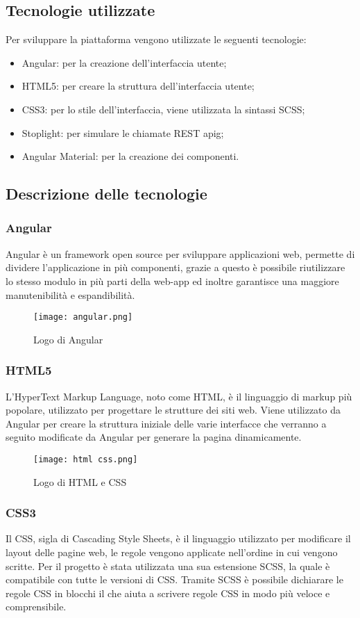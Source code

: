 \subsection{Tecnologie utilizzate}
Per sviluppare la piattaforma vengono utilizzate le seguenti tecnologie:
\begin{itemize}
    \item Angular: per la creazione dell'interfaccia utente;
    \item HTML5: per creare la struttura dell'interfaccia utente;
    \item CSS3: per lo stile dell'interfaccia, viene utilizzata la sintassi SCSS;
    \item Stoplight: per simulare le chiamate REST \gls{apig};
    \item Angular Material: per la creazione dei componenti.
\end{itemize}
\subsection{Descrizione delle tecnologie}
\subsubsection{Angular}
Angular è un framework open source per sviluppare applicazioni web, permette di dividere l'applicazione in più componenti, grazie a questo è possibile riutilizzare lo stesso modulo in più parti della web-app ed inoltre garantisce una maggiore manutenibilità e espandibilità.
\begin{figure}[H]
    \centering
    \texttt{[image: angular.png]}
    \caption{Logo di Angular}
\end{figure}
\subsubsection{HTML5}
L'HyperText Markup Language, noto come HTML, è il linguaggio di markup più popolare, utilizzato per progettare le strutture dei siti web. Viene utilizzato da Angular per creare la struttura iniziale delle varie interfacce che verranno a seguito modificate da Angular per generare la pagina dinamicamente.
\begin{figure}[H]
    \centering
    \texttt{[image: html css.png]}
    \caption{Logo di HTML e CSS}
\end{figure}
\subsubsection{CSS3}
Il CSS, sigla di Cascading Style Sheets, è il linguaggio utilizzato per modificare il layout delle pagine web, le regole vengono applicate nell'ordine in cui vengono scritte. Per il progetto è stata utilizzata una sua estensione SCSS, la quale è compatibile con tutte le versioni di CSS. Tramite SCSS è possibile dichiarare le regole CSS in blocchi il che aiuta a scrivere regole CSS in modo più veloce e comprensibile.
